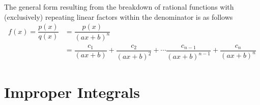 \begin{example}
The general form resulting from the breakdown of rational functions with (exclusively) repeating linear factors within the denominator is as follows
\begin{align*}
    f(x) = \dfrac{p(x)}{q(x)} &= \dfrac{p(x)}{(ax + b)^{n}}\\[2ex]
    &= \dfrac{c_{1}}{(ax + b)} + \dfrac{c_{2}}{(ax + b)^{2}} + \cdots \dfrac{c_{n-1}}{(ax + b)^{n-1}} + \dfrac{c_{n}}{(ax + b)^{n}}
\end{align*}
\end{example}

\newpage
\section{Improper Integrals}